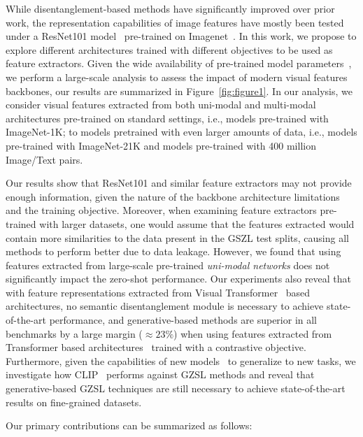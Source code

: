 While disentanglement-based methods have significantly improved over prior work,
the representation capabilities of image features have mostly been tested under a ResNet101 model~\cite{RNs} pre-trained on Imagenet~\cite{AWA2, Liu2018GeneralizedZL}. 
In this work, we propose to explore different architectures trained with different objectives to be used as feature extractors. Given the wide availability of pre-trained model parameters~\cite{Gavrikov2022CNNFD, timm, Croce2021RobustBenchAS}, we perform a large-scale analysis to assess the impact of modern visual features backbones, our results are summarized in Figure~\ref{fig:figure1}. 
In our analysis, we consider visual features extracted from both uni-modal and multi-modal architectures pre-trained on standard settings, i.e., models pre-trained with ImageNet-1K; to models pretrained with even larger amounts of data, i.e., models pre-trained with ImageNet-21K and models pre-trained with 400 million Image/Text pairs.

Our results show that ResNet101 and similar feature extractors may not provide enough information, given the nature of the backbone architecture limitations and the training objective. 
Moreover, when examining feature extractors pre-trained with larger datasets, one would assume that the features extracted would contain more similarities to the data present in the GSZL test splits, causing all methods to perform better due to data leakage. However, we found that using features extracted from large-scale pre-trained {\em uni-modal networks} does not significantly impact the zero-shot performance.
Our experiments also reveal that with feature representations extracted from Visual Transformer~\cite{ViT} based architectures, no semantic disentanglement module is necessary to achieve state-of-the-art performance, and generative-based methods are superior in all benchmarks by a large margin ($\approx23\%$) when using features extracted from Transformer based architectures~\cite{ViT} trained with a contrastive objective.
Furthermore, given the capabilities of new models~\cite{CLIP, ALIGN, Singh2022FLAVAAF} to generalize to new tasks, we investigate how CLIP~\cite{CLIP} performs against GZSL methods and reveal that generative-based GZSL techniques are still necessary to achieve state-of-the-art results on fine-grained datasets.


Our primary contributions can be summarized as follows:


